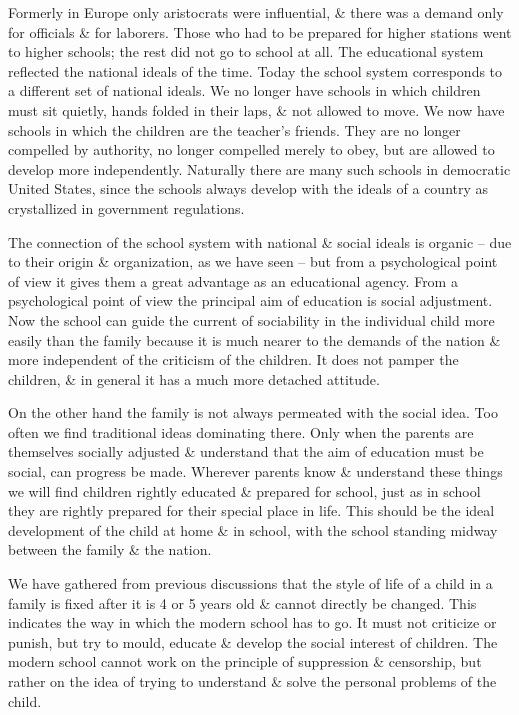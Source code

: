 \documentclass{article}
\numberwithin{equation}{section}
\begin{document}
Formerly in Europe only aristocrats were influential, \& there was a demand only for officials \& for laborers. Those who had to be prepared for higher stations went to higher schools; the rest did not go to school at all. The educational system reflected the national ideals of the time. Today the school system corresponds to a different set of national ideals. We no longer have schools in which children must sit quietly, hands folded in their laps, \& not allowed to move. We now have schools in which the children are the teacher's friends. They are no longer compelled by authority, no longer compelled merely to obey, but are allowed to develop more independently. Naturally there are many such schools in democratic United States, since the schools always develop with the ideals of a country as crystallized in government regulations.

The connection of the school system with national \& social ideals is organic -- due to their origin \& organization, as we have seen -- but from a psychological point of view it gives them a great advantage as an educational agency. From a psychological point of view the principal aim of education is social adjustment. Now the school can guide the current of sociability in the individual child more easily than the family because it is much nearer to the demands of the nation \& more independent of the criticism of the children. It does not pamper the children, \& in general it has a much more detached attitude.

On the other hand the family is not always permeated with the social idea. Too often we find traditional ideas dominating there. Only when the parents are themselves socially adjusted \& understand that the aim of education must be social, can progress be made. Wherever parents know \& understand these things we will find children rightly educated \& prepared for school, just as in school they are rightly prepared for their special place in life. This should be the ideal development of the child at home \& in school, with the school standing midway between the family \& the nation.

We have gathered from previous discussions that the style of life of a child in a family is fixed after it is 4 or 5 years old \& cannot directly be changed. This indicates the way in which the modern school has to go. It must not criticize or punish, but try to mould, educate \& develop the social interest of children. The modern school cannot work on the principle of suppression \& censorship, but rather on the idea of trying to understand \& solve the personal problems of the child.
\end{document}
